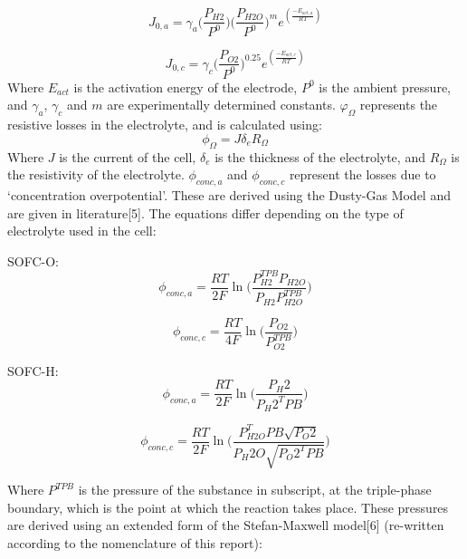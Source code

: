 \begin{equation}
J_{0,a}= \gamma_{a} \Big (\frac{P_{H2}}{P^{0}}\Big ) \Big (\frac{P_{H2O}}{P^{0}} \Big )^{m} e^{ (\frac{-E_{act,a}}{RT}  )}			
\end{equation}

\begin{equation}
J_{0,c}= \gamma_{c} \Big (\frac{P_{O2}}{P^{0}} \Big )^{0.25} e^{(\frac{-E_{act,c}}{RT})} 					
\end{equation}
Where $E_{act}$ is the activation energy of the electrode, $P^0$ is the ambient pressure, and $\gamma_a$, $\gamma_c$ and $m$ are experimentally determined constants.
$φ_Ω$ represents the resistive losses in the electrolyte, and is calculated using:
\begin{equation}
\phi_{\Omega}=J\delta_{e} R_{\Omega} 						
\end{equation}
Where $J$ is the current of the cell, $\delta_e$ is the thickness of the electrolyte, and $R_\Omega$ is the resistivity of the electrolyte.
$\phi_{conc,a}$ and $\phi_{conc,c}$ represent the losses due to ‘concentration overpotential’. These are derived using the Dusty-Gas Model and are given in literature[5]. The equations differ depending on the type of electrolyte used in the cell:

SOFC-O:	
\begin{equation}
\phi_{conc,a} = \frac{RT}{2F} \ln \Big (\frac{P_{H2}^{TPB} P_{H2O}}{P_{H2} P_{H2O}^{TPB}} \Big )
\end{equation}

\begin{equation}
\phi_{conc,c} = \frac{RT}{4F} \ln \Big (\frac{P_{O2}}{P_{O2}^{TPB}} \Big ) 					
\end{equation}

SOFC-H:	
\begin{equation}
\phi_{conc,a}=  \frac{RT}{2F} \ln \Big (\frac{ P_H2 }{ P_H2^TPB } \Big )						
\end{equation}

\begin{equation}
\phi_{conc,c}=  \frac{RT}{2F} \ln \Big ( \frac{P_{H2O}^TPB \sqrt{{P_O2}}}{P_H2O \sqrt{P_O2^TPB}} \Big) 
\end{equation}

Where $P^{TPB}$ is the pressure of the substance in subscript, at the triple-phase boundary, which is the point at which the reaction takes place. These pressures are derived using an extended form of the Stefan-Maxwell model[6] (re-written according to the nomenclature of this report):


